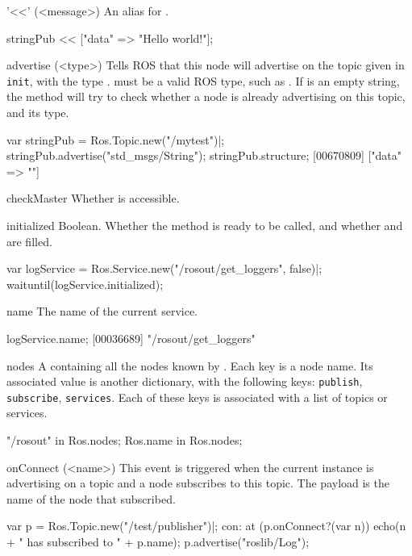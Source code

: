 \begin{urbiscriptapi}
\item['<<'](<message>)%
  An alias for .
\begin{urbiunchecked}
stringPub << ["data" => "Hello world!"];
\end{urbiunchecked}


\item[advertise](<type>)%
  Tells ROS that this node will advertise on the topic given in
  \lstinline{init}, with the type .  must be a valid ROS
  type, such as . If  is an empty string, the
  method will try to check whether a node is already advertising on this
  topic, and its type.
\begin{urbiscript}
var stringPub = Ros.Topic.new("/mytest")|;
stringPub.advertise("std_msgs/String");
stringPub.structure;
[00670809] ["data" => ""]
\end{urbiscript}


\item[checkMaster]
  Whether  is accessible.


\item[initialized]%
  Boolean.  Whether the method  is ready to be called, and
  whether  and  are filled.
\begin{urbiscript}
var logService = Ros.Service.new("/rosout/get_loggers", false)|;
waituntil(logService.initialized);
\end{urbiscript}


\item[name]%
  The name of the current service.
\begin{urbiscript}
logService.name;
[00036689] "/rosout/get_loggers"
\end{urbiscript}


\item[nodes]%
  A  containing all the nodes known by
  . Each key is a node name. Its associated value is
  another dictionary, with the following keys: \lstinline{publish},
  \lstinline{subscribe}, \lstinline{services}.  Each of these keys is
  associated with a list of topics or services.
\begin{urbiassert}
"/rosout" in Ros.nodes;
Ros.name in Ros.nodes;
\end{urbiassert}


\item[onConnect](<name>)%
  This event is triggered when the current instance is advertising on a
  topic and a node subscribes to this topic. The payload  is the
  name of the node that subscribed.
\begin{urbiunchecked}
var p = Ros.Topic.new("/test/publisher")|;
con: at (p.onConnect?(var n))
  echo(n + " has subscribed to " + p.name);
p.advertise("roslib/Log");
\end{urbiunchecked}



\end{urbiscriptapi}
